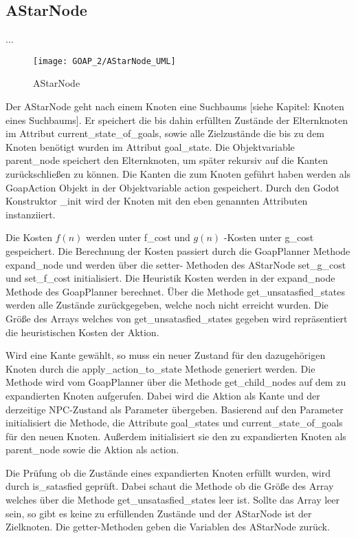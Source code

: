 \subsection{AStarNode}

...

\begin{figure}[h]
  \centering
  \texttt{[image: GOAP\_2/AStarNode\_UML]}
	\captionsetup{justification=justified, format=plain}
  \caption{AStarNode}
  \label{AStarNode}
\end{figure}

Der AStarNode geht nach einem Knoten eine Suchbaums [siehe Kapitel: Knoten eines Suchbaums]. Er speichert die bis dahin erfüllten Zustände der Elternknoten im Attribut current\_state\_of\_goals, sowie alle Zielzustände die bis zu dem Knoten benötigt wurden im Attribut goal\_state. Die Objektvariable parent\_node speichert den Elternknoten, um später rekursiv auf die Kanten zurückschließen zu können. Die Kanten die zum Knoten geführt haben werden als GoapAction Objekt in der Objektvariable action gespeichert. Durch den Godot Konstruktor \_init wird der Knoten mit den eben genannten Attributen instanziiert.

Die Kosten $f(n)$ werden unter f\_cost und $g(n)$ -Kosten unter g\_cost gespeichert. Die Berechnung der Kosten passiert durch die GoapPlanner Methode expand\_node und werden über die setter- Methoden des AStarNode set\_g\_cost und set\_f\_cost initialisiert. Die Heuristik Kosten werden in der expand\_node Methode des GoapPlanner berechnet. Über die Methode get\_unsatasfied\_states werden alle Zustände zurückgegeben, welche noch nicht erreicht wurden. Die Größe des Arrays welches von get\_unsatasfied\_states gegeben wird repräsentiert die heuristischen Kosten der Aktion.

Wird eine Kante gewählt, so muss ein neuer Zustand für den dazugehörigen Knoten durch die apply\_action\_to\_state Methode generiert werden. Die Methode wird vom GoapPlanner über die Methode get\_child\_nodes auf dem zu expandierten Knoten aufgerufen. Dabei wird die Aktion als Kante und der derzeitige NPC-Zustand als Parameter übergeben. Basierend auf den Parameter initialisiert die Methode, die Attribute goal\_states und current\_state\_of\_goals für den neuen Knoten. Außerdem initialisiert sie den zu expandierten Knoten als parent\_node sowie die Aktion als action.

Die Prüfung ob die Zustände eines expandierten Knoten erfüllt wurden, wird durch is\_satasfied geprüft. Dabei schaut die Methode ob die Größe des Array welches über die Methode get\_unsatasfied\_states leer ist. Sollte das Array leer sein, so gibt es keine zu erfüllenden Zustände und der AStarNode ist der Zielknoten. Die getter-Methoden geben die Variablen des AStarNode zurück.




